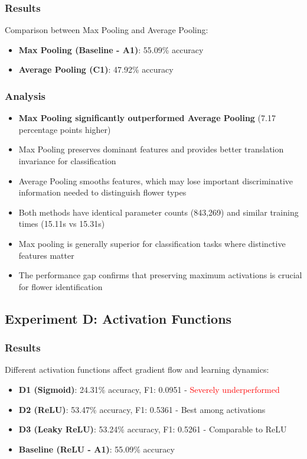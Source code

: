 \documentclass[12pt,a4paper]{article}
\begin{document}
\subsubsection{Results}
Comparison between Max Pooling and Average Pooling:

\begin{itemize}
    \item \textbf{Max Pooling (Baseline - A1)}: 55.09\% accuracy
    \item \textbf{Average Pooling (C1)}: 47.92\% accuracy
\end{itemize}

\subsubsection{Analysis}
\begin{itemize}
    \item \textbf{Max Pooling significantly outperformed Average Pooling} (7.17 percentage points higher)
    \item Max Pooling preserves dominant features and provides better translation invariance for classification
    \item Average Pooling smooths features, which may lose important discriminative information needed to distinguish flower types
    \item Both methods have identical parameter counts (843,269) and similar training times (15.11s vs 15.31s)
    \item Max pooling is generally superior for classification tasks where distinctive features matter
    \item The performance gap confirms that preserving maximum activations is crucial for flower identification
\end{itemize}

\subsection{Experiment D: Activation Functions}

\subsubsection{Results}
Different activation functions affect gradient flow and learning dynamics:

\begin{itemize}
    \item \textbf{D1 (Sigmoid)}: 24.31\% accuracy, F1: 0.0951 - \textcolor{red}{Severely underperformed}
    \item \textbf{D2 (ReLU)}: 53.47\% accuracy, F1: 0.5361 - Best among activations
    \item \textbf{D3 (Leaky ReLU)}: 53.24\% accuracy, F1: 0.5261 - Comparable to ReLU
    \item \textbf{Baseline (ReLU - A1)}: 55.09\% accuracy
\end{itemize}
\end{document}
